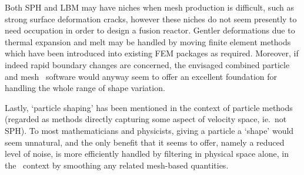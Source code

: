Both SPH and LBM may have niches when mesh production is difficult, such as strong
surface deformation cracks, however these niches do not seem presently to need
occupation in order to design a fusion reactor. Gentler deformations due to thermal
expansion and melt may be handled by moving finite element methods which have been
introduced into existing FEM packages as required. Moreover, if indeed rapid
boundary changes are concerned, the envisaged combined particle and mesh \nep\ 
software would anyway seem to offer an excellent foundation for handling the whole
range of shape variation.

Lastly, `particle shaping' has been mentioned in the context of particle methods
(regarded as methods directly capturing some aspect of velocity space, ie.\ not SPH).
To most mathematicians and physicists, giving a particle a `shape' would seem unnatural,
and the only benefit that it seems to offer, namely a reduced level of noise,
is more efficiently handled by filtering in physical space alone,
in the \nep\ context by smoothing any related mesh-based quantities.



